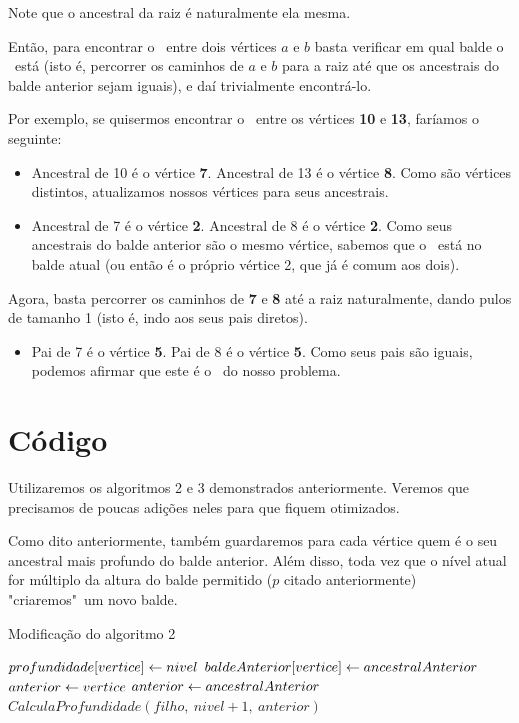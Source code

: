 Note que o ancestral da raiz é naturalmente ela mesma.

Então, para encontrar o \LCA\ entre dois vértices $a$ e $b$ basta verificar em qual balde o \LCA\ está (isto é, percorrer os caminhos de $a$ e $b$ para a raiz até que os ancestrais do balde anterior sejam iguais), e daí trivialmente encontrá-lo.

Por exemplo, se quisermos encontrar o \LCA\ entre os vértices \textbf{10} e \textbf{13}, faríamos o seguinte:

\begin{itemize}
    \item Ancestral de 10 é o vértice \textbf{7}. Ancestral de 13 é o vértice \textbf{8}. Como são vértices distintos, atualizamos nossos vértices para seus ancestrais.
    \item Ancestral de 7 é o vértice \textbf{2}. Ancestral de 8 é o vértice \textbf{2}. Como seus ancestrais do balde anterior são o mesmo vértice, sabemos que o \LCA\ está no balde atual (ou então é o próprio vértice 2, que já é comum aos dois).
\end{itemize}
Agora, basta percorrer os caminhos de \textbf{7} e \textbf{8} até a raiz naturalmente, dando pulos de tamanho 1 (isto é, indo aos seus pais diretos).
\begin{itemize}
    \item Pai de 7 é o vértice \textbf{5}. Pai de 8 é o vértice \textbf{5}. Como seus pais são iguais, podemos afirmar que este é o \LCA\ do nosso problema.
\end{itemize}

\section{Código}

Utilizaremos os algoritmos 2 e 3 demonstrados anteriormente. Veremos que precisamos de poucas adições neles para que fiquem otimizados.

\hspace{1cm}

Como dito anteriormente, também guardaremos para cada vértice quem é o seu ancestral mais profundo do balde anterior. Além disso, toda vez que o nível atual for múltiplo da altura do balde permitido ($p$ citado anteriormente)  "criaremos"\ um novo balde.

\begin{algorithm}[H]
\caption{Modificação do algoritmo 2}
\begin{algorithmic}[1]
    \State $profundidade[vertice] \leftarrow nivel$
    \State $baldeAnterior[vertice] \leftarrow ancestralAnterior$
        \State $anterior \leftarrow vertice$
    \Else
        \State $anterior \leftarrow ancestralAnterior$
    \EndIf
        \State $CalculaProfundidade(filho,\ nivel+1,\ anterior)$
    \EndFor
\EndFunction
\end{algorithmic}
\end{algorithm}

